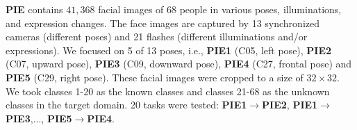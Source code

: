 \documentclass[journal]{IEEEtran}
\begin{document}
\textbf{PIE}\cite{DBLP:journals/pami/SimBB03} contains $41,368$ facial images of 68 people in various poses, illuminations, and expression changes.  The face images are captured by 13 synchronized cameras (different poses) and 21 flashes (different illuminations and/or expressions). We focused on 5 of 13 poses, i.e., \textbf{PIE1} (C05, left pose), \textbf{PIE2} (C07, upward pose), \textbf{PIE3} (C09, downward pose), \textbf{PIE4} (C27, frontal pose) and \textbf{PIE5} (C29, right pose).
These facial images were cropped to a size of $32\times32$. We took classes 1-20 as the known classes and classes 21-68 as the unknown classes in the target domain. 20 tasks were tested: \textbf{PIE1}$\rightarrow$\textbf{PIE2}, \textbf{PIE1}$\rightarrow$\textbf{PIE3},..., \textbf{PIE5}$\rightarrow$\textbf{PIE4}.
\end{document}
